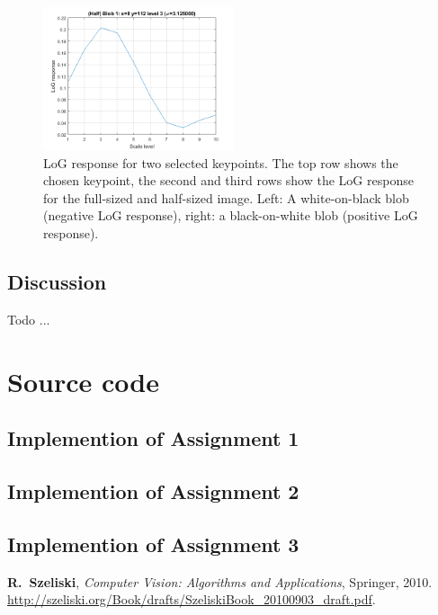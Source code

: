\documentclass[a4paper,psfig,subfigure,epsfig,fleqn,ausarbeitung,amssmb,float,caption,fontenc]{article}
\begin{document}
\begin{figure}[h]
	\includegraphics[width=0.5\textwidth]{figures/a3_butterfly_log_half_2.png}
	\caption{LoG response for two selected keypoints. The top row shows the chosen keypoint, the second and third rows show the LoG response for the full-sized and half-sized image. Left: A white-on-black blob (negative LoG response), right: a black-on-white blob (positive LoG response).}
	\label{fig:a3:logresponse}
\end{figure}


\subsection{Discussion}

Todo ...

\appendix
\section{Source code}
\subsection{Implemention of Assignment 1}
\subsection{Implemention of Assignment 2}
\subsection{Implemention of Assignment 3}



\fontsize{9}{10pt}


\begin{thebibliography}{10}


{\bf R.~Szeliski},
\newblock \textit{Computer Vision: Algorithms and Applications},
\newblock Springer, 2010.
\newblock \url{http://szeliski.org/Book/drafts/SzeliskiBook_20100903_draft.pdf}.

\end{thebibliography}
\end{document}
